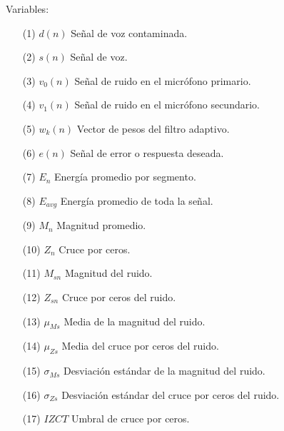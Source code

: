 \vskip 0.3cm
Variables:
\begin{enumerate}
\item[(1)] $d(n) $ \hspace*{0.8cm} Señal de voz contaminada.
\item[(2)] $s(n)$ \hspace*{0.8cm} Señal de voz.
\item[(3)] $v_{0}(n)$ \hspace*{0.6cm} Señal de ruido en el micrófono primario.
\item[(4)] $v_{1}(n)$ \hspace*{0.6cm} Señal de ruido en el micrófono secundario.
\item[(5)] $w_{k}(n)$ \hspace*{0.5cm} Vector de pesos del filtro adaptivo.
\item[(6)] $e(n)$ \hspace*{0.8cm} Señal de error o respuesta deseada.
\item[(7)] $E_{n}$ \hspace*{1.0cm} Energía promedio por segmento.
\item[(8)] $E_{avg}$ \hspace*{0.75cm} Energía promedio de toda la señal.
\item[(9)] $M_{n}$ \hspace*{0.9cm} Magnitud promedio.
\item[(10)] $Z_{n}$ \hspace*{1.0cm} Cruce por ceros.
\item[(11)] $M_{sn}$ \hspace*{0.8cm} Magnitud del ruido.
\item[(12)] $Z_{sn}$ \hspace*{0.85cm} Cruce por ceros del ruido.
\item[(13)] $\mu_{Ms}$ \hspace*{0.75cm} Media de la magnitud del ruido.
\item[(14)] $\mu_{Zs}$ \hspace*{0.85cm} Media del cruce por ceros del ruido.
\item[(15)] $\sigma_{Ms}$ \hspace*{0.8cm} Desviación estándar de la magnitud del ruido.
\item[(16)] $\sigma_{Zs}$ \hspace*{0.9cm} Desviación estándar del cruce por ceros del ruido.
\item[(17)] $IZCT$ \hspace*{0.4cm} Umbral de cruce por ceros.

\end{enumerate}
